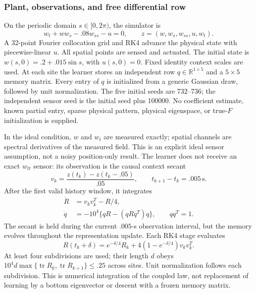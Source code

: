 \documentclass[journal]{IEEEtran}
\begin{document}
\subsubsection{Plant, observations, and free differential row}
On the periodic domain $s\in[0,2\pi)$, the simulator is
\begin{equation}
 w_t+w w_s-.08w_{ss}-u=0,
 \qquad z=(w,w_s,w_{ss},u,w_t).
 \label{eq:direct_burgers_plant}
\end{equation}
A 32-point Fourier collocation grid and RK4 advance the physical state with
piecewise-linear $u$. All spatial points are sensed and actuated. The initial
state is $w(s,0)=.2+.015\sin s$, with $u(s,0)=0$. Fixed identity context scales
are used. At each site the learner stores an independent row
$q\in\mathbb R^{1\times5}$ and a $5\times5$ memory matrix. Every entry of $q$
is initialized from a generic Gaussian draw, followed by unit normalization.
The five initial seeds are 732--736; the independent sensor seed is the initial
seed plus 100000. No coefficient estimate, known partial entry, sparse physical
pattern, physical eigenspace, or true-$F$ initialization is supplied.

In the ideal condition, $w$ and $w_t$ are measured exactly; spatial channels
are spectral derivatives of the measured field. This is an explicit ideal
sensor assumption, not a noisy position-only result. The learner does not
receive an exact $w_{tt}$ sensor: its observation is the causal context secant
\begin{equation}
 v_k=\frac{z(t_k)-z(t_k-.05)}{.05},\qquad t_{k+1}-t_k=.005\,\mathrm{s}.
 \label{eq:direct_burgers_observation}
\end{equation}
After the first valid history window, it integrates
\begin{equation}
 \begin{aligned}
 \dot R&=v_kv_k^T-R/4,\\
 \dot q&=-10^4\{qR-(qRq^T)q\},\qquad qq^T=1.
 \end{aligned}
 \label{eq:direct_burgers_law}
\end{equation}
The secant is held during the current $.005$-s observation interval, but the
memory evolves throughout the representation update. Each RK4 stage evaluates
\begin{equation}
 R(t_k+\delta)=e^{-\delta/4}R_k+
               4(1-e^{-\delta/4})v_kv_k^T.
 \label{eq:direct_burgers_memory}
\end{equation}
At least four subdivisions are used; their length $d$ obeys
$10^4d\max\{\operatorname{tr}R_k,\operatorname{tr}R_{k+1}\}\leq.25$
across sites. Unit normalization follows each subdivision. This is numerical
integration of the coupled law, not replacement of learning by a bottom
eigenvector or descent with a frozen memory matrix.
\end{document}
